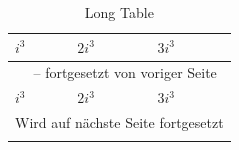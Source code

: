\begin{center}
\begin{longtable}{l|l|l}


 \hline \hline
 $i^3$ & $2i^3$ & $3i^3$ \bigstrut \\ \hline
 \endfirsthead
 
 \multicolumn{3}{c}{\tablename\ \thetable{} -- fortgesetzt von voriger Seite} \\
 \hline
 $i^3$ & $2i^3$ & $3i^3$ \bigstrut \\ \hline 
 \endhead
 
 \hline
 \multicolumn{3}{c}{Wird auf nächste Seite fortgesetzt} \\ \hline
 \endfoot
 
 \hline \hline
 \caption{Long Table}
 \label{lt}
 \endlastfoot
 

\end{longtable}
\end{center}
